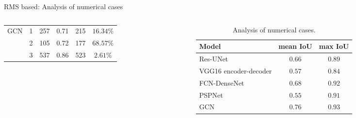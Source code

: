 \documentclass[10pt,aspectratio=169,dvipsnames]{beamer} %
\begin{document}
\begin{frame}[standout]{RMS based: Analysis of numerical cases}
\begin{columns}[T]
\begin{column}[c]{0.48\textwidth}
\begin{table}[ht!]
\begin{tabular}{cccccc}
					\midrule
					\multirow{3}{*}{GCN} 
					& 1 & 257 & \multicolumn{1}{c}{0.71} & \multicolumn{1}{c}{215} & \(16.34\%\) \\ 
					& 2 & 105 & \multicolumn{1}{c}{0.72} & \multicolumn{1}{c}{177} & \(68.57\%\) \\ 
					& 3 & 537 & \multicolumn{1}{c}{0.86} & \multicolumn{1}{c}{523} & \(2.61\%\) \\ 
					\bottomrule[1.5pt]
				\end{tabular}	
			\end{table}
			\end{column}
			\hfill
			\begin{column}[c]{0.9\textwidth}
				\begin{table}[ht!]
					\centering
					\caption{Analysis of numerical cases.}
					\label{tab:table_all_numerical_cases_backup}	
					\begin{tabular}{lcc}
						\toprule[1.5pt]
						Model & mean IoU & max IoU \\ 
						\midrule 
						Res-UNet & \(0.66\) & \(0.89\) \\ 
						VGG16 encoder-decoder & \(0.57\) & \(0.84\) \\ 
						FCN-DenseNet & \(0.68\) & \(0.92\) \\ 
						PSPNet & \(0.55\) & \(0.91\) \\ 
						GCN & \(0.76\) & \(0.93\) \\ 
						\bottomrule[1.5pt]
					\end{tabular}
				\end{table}
			\end{column}
		\end{columns}
	\end{frame}
\end{document}
